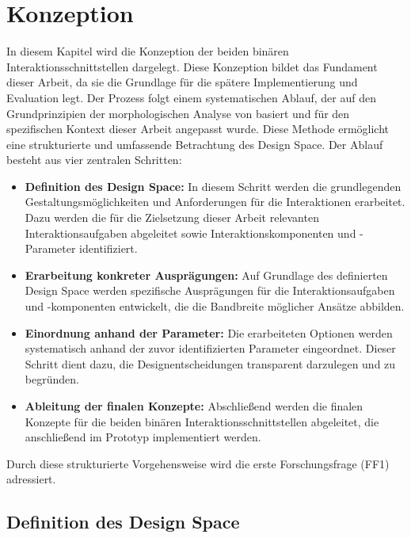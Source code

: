 \chapter{Konzeption}
\label{chap:Konzept}


In diesem Kapitel wird die Konzeption der beiden binären Interaktionsschnittstellen dargelegt. Diese Konzeption bildet das Fundament dieser Arbeit, da sie die Grundlage für die spätere Implementierung und Evaluation legt. Der Prozess folgt einem systematischen Ablauf, der auf den Grundprinzipien der morphologischen Analyse von \citet{10.1007/978-3-642-87617-2_14} basiert und für den spezifischen Kontext dieser Arbeit angepasst wurde. Diese Methode ermöglicht eine strukturierte und umfassende Betrachtung des Design Space. Der Ablauf besteht aus vier zentralen Schritten:

\begin{itemize}
    \item \textbf{Definition des Design Space:}
    In diesem Schritt werden die grundlegenden Gestaltungsmöglichkeiten und Anforderungen für die Interaktionen erarbeitet. Dazu werden die für die Zielsetzung dieser Arbeit relevanten Interaktionsaufgaben abgeleitet sowie Interaktionskomponenten und -Parameter identifiziert.
    \item \textbf{Erarbeitung konkreter Ausprägungen:}
    Auf Grundlage des definierten Design Space werden spezifische Ausprägungen für die Interaktionsaufgaben und -komponenten entwickelt, die die Bandbreite möglicher Ansätze abbilden.
    \item \textbf{Einordnung anhand der Parameter:}
    Die erarbeiteten Optionen werden systematisch anhand der zuvor identifizierten Parameter eingeordnet. Dieser Schritt dient dazu, die Designentscheidungen transparent darzulegen und zu begründen.
    \item \textbf{Ableitung der finalen Konzepte:}
    Abschließend werden die finalen Konzepte für die beiden binären Interaktionsschnittstellen abgeleitet, die anschließend im Prototyp implementiert werden.
\end{itemize}
 
Durch diese strukturierte Vorgehensweise wird die erste Forschungsfrage (FF1) adressiert.   

\section{Definition des Design Space}

